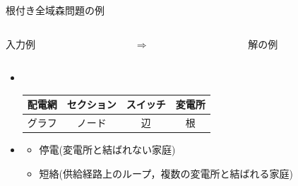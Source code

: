 \documentclass[dvipdfmx,11pt]{beamer}
\begin{document}
\begin{frame}{根付き全域森問題の例}
  \begin{columns}
    \begin{column}{0.45\textwidth}\centering
      \begin{exampleblock}{入力例}
	\centering
	
      \end{exampleblock}
    \end{column}
    \begin{column}{0.05\textwidth}\centering
      $\Rightarrow$
    \end{column}
    \begin{column}{0.45\textwidth}\centering
      \begin{exampleblock}{解の例}
        \centering
        
      \end{exampleblock}
    \end{column}
  \end{columns}
  \vfill
  \begin{itemize}
  \item {} \\
	 \begin{center}
      \begin{minipage}[c]{0.7\textwidth}
	   \begin{block}{}
		\centering
		\begin{tabular}{c|ccc}
		配電網 & セクション & スイッチ & 変電所 \\
		\hline
		グラフ & ノード & 辺 & 根
		\end{tabular}
	   \end{block}
      \end{minipage}
	 \end{center}\vfill
   \item {}
		 \begin{itemize}
		  \item 停電(変電所と結ばれない家庭)
		  \item 短絡(供給経路上のループ，複数の変電所と結ばれる家庭)
		 \end{itemize}
  \end{itemize}
\end{frame}
\end{document}

